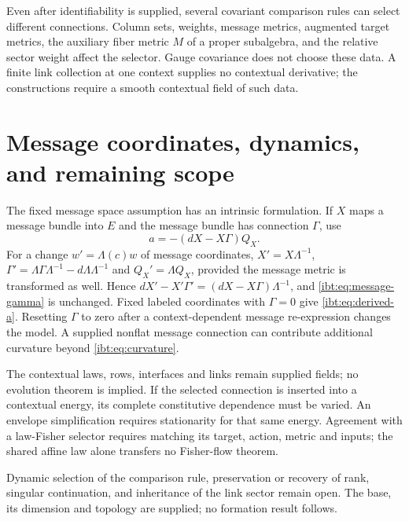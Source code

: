 Even after identifiability is supplied, several covariant comparison rules can select different connections. Column sets, weights, message metrics, augmented target metrics, the auxiliary fiber metric $M$ of a proper subalgebra, and the relative sector weight affect the selector. Gauge covariance does not choose these data. A finite link collection at one context supplies no contextual derivative; the constructions require a smooth contextual field of such data.

\section{Message coordinates, dynamics, and remaining scope}
\label{ibt:sec:message-connection}

The fixed message space assumption has an intrinsic formulation. If $X$ maps a message bundle into $E$ and the message bundle has connection $\Gamma$, use
\begin{equation}
 a=-(d X-X\Gamma)Q_X.
 \label{ibt:eq:message-gamma}
\end{equation}
For a change $w'=\Lambda(c)w$ of message coordinates, $X'=X\Lambda^{-1}$, $\Gamma'=\Lambda\Gamma\Lambda^{-1}-d\Lambda\Lambda^{-1}$ and $Q_X'=\Lambda Q_X$, provided the message metric is transformed as well. Hence $d X'-X'\Gamma'=(d X-X\Gamma)\Lambda^{-1}$, and \cref{ibt:eq:message-gamma} is unchanged. Fixed labeled coordinates with $\Gamma=0$ give \cref{ibt:eq:derived-a}. Resetting $\Gamma$ to zero after a context-dependent message re-expression changes the model. A supplied nonflat message connection can contribute additional curvature beyond \cref{ibt:eq:curvature}.

The contextual laws, rows, interfaces and links remain supplied fields; no evolution theorem is implied. If the selected connection is inserted into a contextual energy, its complete constitutive dependence must be varied. An envelope simplification requires stationarity for that same energy. Agreement with a law-Fisher selector requires matching its target, action, metric and inputs; the shared affine law alone transfers no Fisher-flow theorem.

Dynamic selection of the comparison rule, preservation or recovery of rank, singular continuation, and inheritance of the link sector remain open. The base, its dimension and topology are supplied; no formation result follows.
